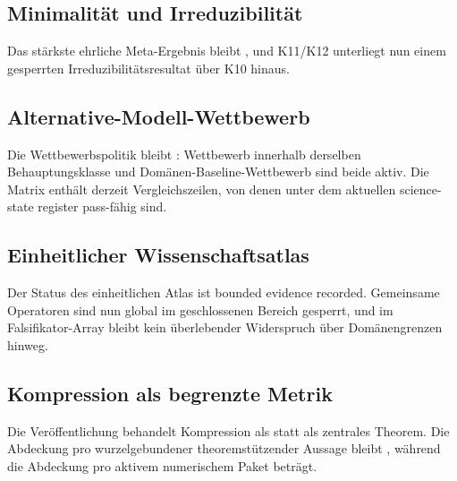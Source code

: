 \subsection{Minimalität und Irreduzibilität}
Das stärkste ehrliche Meta-Ergebnis bleibt , und K11/K12 unterliegt nun einem gesperrten Irreduzibilitätsresultat über K10 hinaus.

\subsection{Alternative-Modell-Wettbewerb}
Die Wettbewerbspolitik bleibt : Wettbewerb innerhalb derselben Behauptungsklasse und Domänen-Baseline-Wettbewerb sind beide aktiv. Die Matrix enthält derzeit  Vergleichszeilen, von denen  unter dem aktuellen science-state register pass-fähig sind.

\subsection{Einheitlicher Wissenschaftsatlas}
Der Status des einheitlichen Atlas ist bounded evidence recorded. Gemeinsame Operatoren sind nun global im geschlossenen Bereich gesperrt, und im Falsifikator-Array bleibt kein überlebender Widerspruch über Domänengrenzen hinweg.

\subsection{Kompression als begrenzte Metrik}
Die Veröffentlichung behandelt Kompression als  statt als zentrales Theorem.
Die Abdeckung pro wurzelgebundener theoremstützender Aussage bleibt , während die Abdeckung pro aktivem numerischem Paket  beträgt.
